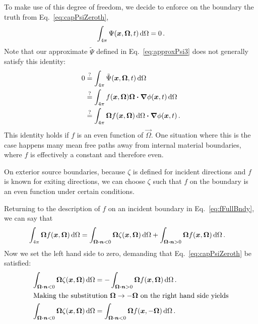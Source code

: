 To make use of this degree of freedom, we decide to enforce on the boundary the
truth from Eq.~\eqref{eq:capPsiZeroth},
\begin{equation*}
  \int_{4\pi} \Psi(\bm{x}, \bm{\Omega}, t) \mathop{}\!\mathrm{d}\Omega
  = 0 \,.
\end{equation*}
Note that our approximate $\tilde\Psi$ defined in Eq.~\eqref{eq:approxPsi3}
does not generally satisfy this identity:
\begin{align*}
  0
&\stackrel{\mathrm{?}}{=} \int_{4\pi} \tilde\Psi(\bm{x}, \bm{\Omega}, t) \mathop{}\!\mathrm{d}\Omega
\\
&\stackrel{\mathrm{?}}{=} \int_{4\pi} f(\bm{x}, \bm{\Omega}) \bm{\Omega}
\bm{\cdot} \bm{\nabla} \phi(\bm{x}, t)
\mathop{}\!\mathrm{d}\Omega
\\
&\stackrel{\mathrm{?}}{=} \int_{4\pi} \bm{\Omega} f(\bm{x}, \bm{\Omega})\mathop{}\!\mathrm{d}\Omega
\bm{\cdot} \bm{\nabla} \phi(\bm{x}, t) \,.
\end{align*}
This identity holds if $f$ is an even function of $\vec{\Omega}$.
One situation where this is the case happens many mean free paths away from
internal material boundaries, where $f$ is effectively a constant and therefore
even.

On exterior source boundaries, because $\zeta$ is defined for incident
directions and $f$ is known for exiting directions, we can choose $\zeta$ such
that $f$ on the boundary is an even function under certain conditions.

Returning to the description of $f$ on an incident boundary in
Eq.~\eqref{eq:fFullBndy}, we can say that
\begin{align*}
  \int_{4\pi} \bm{\Omega} f(\bm{x}, \bm{\Omega})\mathop{}\!\mathrm{d}\Omega
  &= \int_{\bm{\Omega} \bm{\cdot} \bm{n} < 0}
  \bm{\Omega} \zeta(\bm{x}, \bm{\Omega})\mathop{}\!\mathrm{d}\Omega
  + \int_{\bm{\Omega} \bm{\cdot} \bm{n} > 0}
  \bm{\Omega} f(\bm{x}, \bm{\Omega})\mathop{}\!\mathrm{d}\Omega\,.
\end{align*}
Now we set the left hand side to zero, demanding that
Eq.~\eqref{eq:capPsiZeroth} be satisfied:
\begin{align} \nonumber
  \int_{\bm{\Omega} \bm{\cdot} \bm{n} < 0}
  \bm{\Omega} \zeta(\bm{x}, \bm{\Omega})\mathop{}\!\mathrm{d}\Omega
  &= -\int_{\bm{\Omega} \bm{\cdot} \bm{n} > 0}
  \bm{\Omega} f(\bm{x}, \bm{\Omega})\mathop{}\!\mathrm{d}\Omega \,.
  \\ 
  \intertext{Making the substitution $\bm{\Omega}\to -\bm{\Omega}$ on the
  right hand side yields}
  \label{eq:zetaCondition}
  \int_{\bm{\Omega} \bm{\cdot} \bm{n} < 0}
  \bm{\Omega} \zeta(\bm{x}, \bm{\Omega})\mathop{}\!\mathrm{d}\Omega
  &= \int_{\bm{\Omega} \bm{\cdot} \bm{n} < 0}
  \bm{\Omega} f(\bm{x}, -\bm{\Omega})\mathop{}\!\mathrm{d}\Omega \,.
\end{align}

